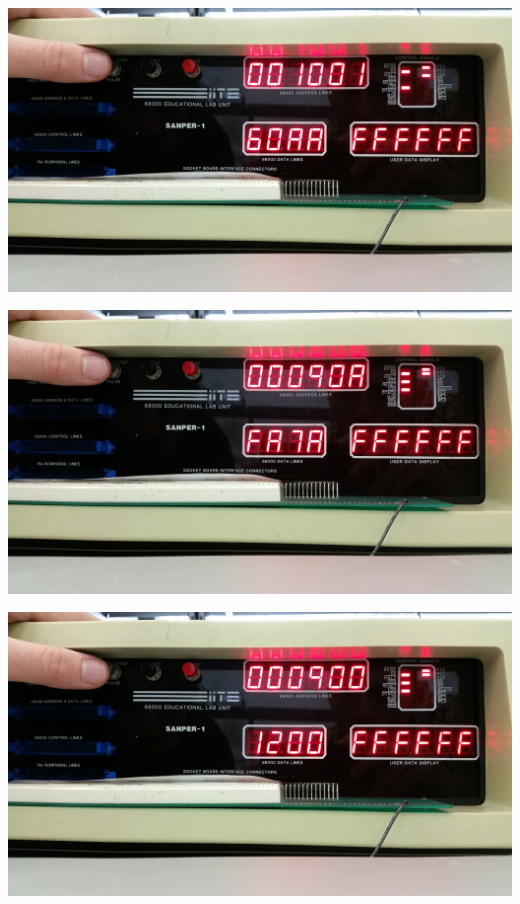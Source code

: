 \documentclass[12pt, twocolumn]{article}
\begin{document}
\begin{center}
\includegraphics[width=1\linewidth]{Lab1/20150120_094845}
\end{center}
\begin{center}
\includegraphics[width=1\linewidth]{Lab1/20150120_094847}
\end{center}
\begin{center}
\includegraphics[width=1\linewidth]{Lab1/20150120_094849}
\end{center}
\end{document}
